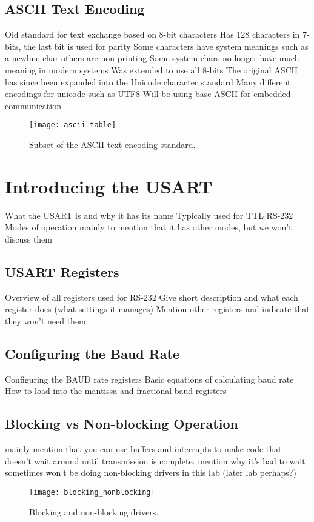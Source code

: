 \documentclass[11pt,fleqn]{book} %
\begin{document}
\subsection{ASCII Text Encoding}
Old standard for text exchange based on 8-bit characters
Has 128 characters in 7-bits, the last bit is used for parity
Some characters have system meanings such as a newline char
others are non-printing
Some system chars no longer have much meaning in modern systems
Was extended to use all 8-bits 
The original ASCII has since been expanded into the Unicode character standard
Many different encodings for unicode such as UTF8
Will be using base ASCII for embedded communication	
\begin{figure}[]
    \centering\texttt{[image: ascii\_table]}
    \caption{Subset of the ASCII text encoding standard.}
    \label{ascii_table}
\end{figure}

\section{Introducing the USART}
What the USART is and why it has its name
Typically used for TTL RS-232
Modes of operation
mainly to mention that it has other modes, but we won't discuss them 
\subsection{USART Registers}	
Overview of all registers used for RS-232
Give short description and what each register does (what settings it manages)
Mention other registers and indicate that they won't need them
\subsection{Configuring the Baud Rate}	
Configuring the BAUD rate registers
Basic equations of calculating baud rate
How to load into the mantissa and fractional baud registers
\subsection{Blocking vs Non-blocking Operation}
mainly mention that you can use buffers and interrupts to make code that doesn't wait around until transmission is complete. 
mention why it's bad to wait sometimes
won't be doing non-blocking drivers in this lab (later lab perhaps?)
\begin{figure}[]
    \centering\texttt{[image: blocking\_nonblocking]}
    \caption{Blocking and non-blocking drivers.}
    \label{blocking_nonblocking}
\end{figure}
\end{document}
